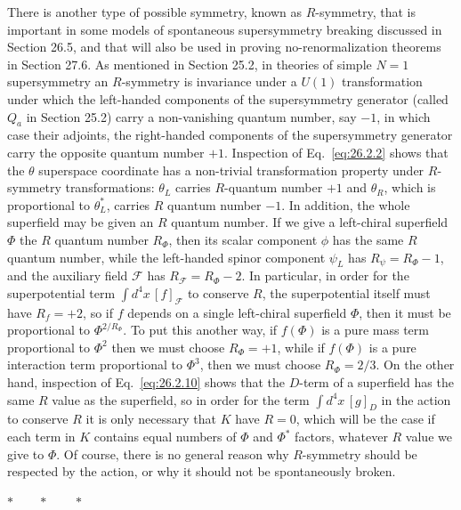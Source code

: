 There is another type of possible symmetry, known as $R$-symmetry, that is
important in some models of spontaneous supersymmetry breaking discussed in
Section 26.5, and that will also be used in proving no-renormalization
theorems in Section 27.6. As mentioned in Section 25.2, in theories of simple
$N=1$ supersymmetry an $R$-symmetry is invariance under a $U(1)$
transformation under which the left-handed components of the supersymmetry
generator (called $Q_a$ in Section 25.2) carry a non-vanishing quantum number,
say $-1$, in which case their adjoints, the right-handed components of the
supersymmetry generator carry the opposite quantum number $+1$. Inspection of
Eq.~\eqref{eq:26.2.2} shows that the $\theta$ superspace coordinate has a
non-trivial transformation property under $R$-symmetry transformations:
$\theta_L$ carries $R$-quantum number $+1$ and $\theta_R$, which is
proportional to $\theta_L^*$, carries $R$ quantum number $-1$. In addition,
the whole superfield may be given an $R$ quantum number. If we give a
left-chiral superfield $\Phi$ the $R$ quantum number $R_\Phi$, then its scalar
component $\phi$ has the same $R$ quantum number, while the left-handed spinor
component $\psi_L$ has $R_\psi=R_\Phi-1$, and the auxiliary field
$\mathcal{F}$ has $R_{\mathcal{F}}=R_\Phi-2$. In particular, in order for the
superpotential term $\int d^4x\,[f]_{\mathcal{F}}$ to conserve $R$, the
superpotential itself must have $R_f=+2$, so if $f$ depends on a single
left-chiral superfield $\Phi$, then it must be proportional to
$\Phi^{2/R_\Phi}$. To put this another way, if $f(\Phi)$ is a pure mass term
proportional to $\Phi^2$ then we must choose $R_\Phi=+1$, while if $f(\Phi)$
is a pure interaction term proportional to $\Phi^3$, then we must choose
$R_\Phi=2/3$. On the other hand, inspection of Eq.~\eqref{eq:26.2.10} shows
that the $D$-term of a superfield has the same $R$ value as the superfield, so
in order for the term $\int d^4x\,[g]_D$ in the action to conserve $R$ it is
only necessary that $K$ have $R=0$, which will be the case if each term in
$K$ contains equal numbers of $\Phi$ and $\Phi^*$ factors, whatever $R$ value
we give to $\Phi$. Of course, there is no general reason why $R$-symmetry
should be respected by the action, or why it should not be spontaneously
broken.

\begin{center}
\(\ast\qquad\ast\qquad\ast\)
\end{center}

